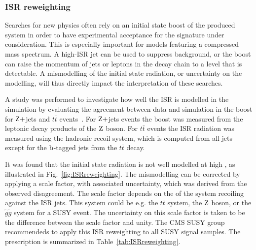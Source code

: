
% 
% 
% 


\subsubsection{ISR reweighting \label{sec:event_ISRreweighting}}

Searches for new physics often rely on an initial state boost of the produced system in order to
have experimental acceptance for the signature under consideration. This is especially important
for models featuring a compressed mass spectrum. A high-\pt ISR jet can be used to suppress
background, or the boost can raise the momentum of jets or leptons in the decay chain to a level
that is detectable.
A mismodelling of the initial state radiation, or uncertainty on the modelling, will thus
directly impact the interpretation of these searches. 

A study was performed to investigate how well the ISR is
modelled in the simulation by evaluating the agreement between data and simulation in the boost \pt
for $\mathrm{Z}+$jets and $t\bar{t}$ events~\cite{Chatrchyan:2013xna,ISRreweighting}. 
For $\mathrm{Z}+$jets events the boost \pt was measured from the leptonic decay products of the $\mathrm{Z}$
boson. For $t\bar{t}$ events the ISR radiation was measured using the hadronic recoil system, which
is computed from all jets except for the $\mathrm{b}$-tagged jets from the $t\bar{t}$ decay. 

It was found that the initial state radiation is not well modelled at high \pt, as illustrated in
Fig.~\ref{fig:ISRreweighting}. The mismodelling
can be corrected by applying a scale factor, with associated uncertainty, which was derived from the
observed disagreement. The scale factor depends on the \pt of the system recoiling against the ISR
jets. This system could be e.g. the $t\bar{t}$ system, the $\mathrm{Z}$ boson, or the $\tilde{g}\tilde{g}$
system for a SUSY event.  The uncertainty on this scale factor is taken to be the difference
between the scale factor and unity. 
The CMS SUSY group recommendeds to apply this ISR reweighting to all SUSY signal samples.
The prescription is summarized in Table~\ref{tab:ISRreweighting}. 

